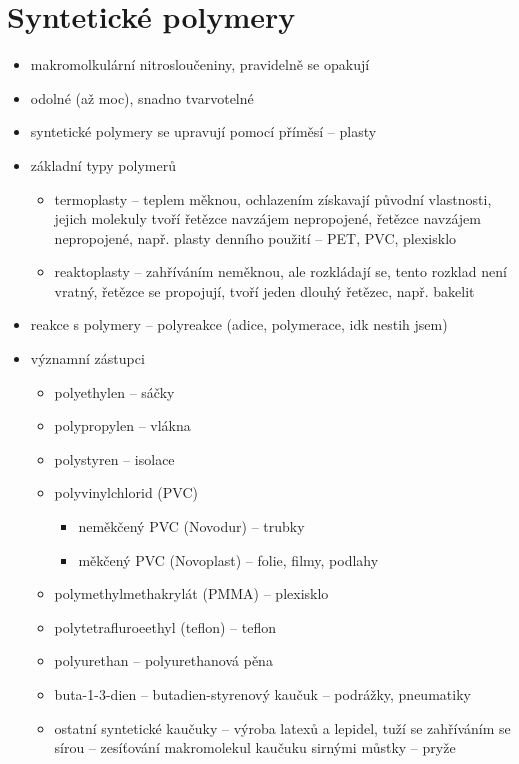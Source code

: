 \documentclass{article}
\begin{document}
\part{Syntetické polymery}
\begin{itemize}
  \item makromolkulární nitrosloučeniny, pravidelně se opakují
  \item odolné (až moc), snadno tvarvotelné
  \item syntetické polymery se upravují pomocí příměsí -- plasty
  \item základní typy polymerů
  \begin{itemize}
    \item termoplasty -- teplem měknou, ochlazením získavají původní vlastnosti, jejich molekuly tvoří řetězce navzájem nepropojené, řetězce navzájem nepropojené, např. plasty denního použití -- PET, PVC, plexisklo
    \item reaktoplasty -- zahříváním neměknou, ale rozkládají se, tento rozklad není vratný, řetězce se propojují, tvoří jeden dlouhý řetězec, např. bakelit
  \end{itemize}
  \item reakce s polymery -- polyreakce (adice, polymerace, idk nestih jsem)
  \item významní zástupci
  \begin{itemize}
    \item polyethylen -- sáčky
    \item polypropylen -- vlákna
    \item polystyren -- isolace
    \item polyvinylchlorid (PVC)
    \begin{itemize}
      \item neměkčený PVC (Novodur) -- trubky
      \item měkčený PVC (Novoplast) -- folie, filmy, podlahy
    \end{itemize}
    \item polymethylmethakrylát (PMMA) -- plexisklo
    \item polytetrafluroeethyl (teflon) -- teflon
    \item polyurethan -- polyurethanová pěna
    \item buta-1-3-dien -- butadien-styrenový kaučuk -- podrážky, pneumatiky
    \item ostatní syntetické kaučuky -- výroba latexů a lepidel, tuží se zahříváním se sírou -- zesíťování makromolekul kaučuku sirnými můstky -- pryže
  \end{itemize}
\end{itemize}
\end{document}
